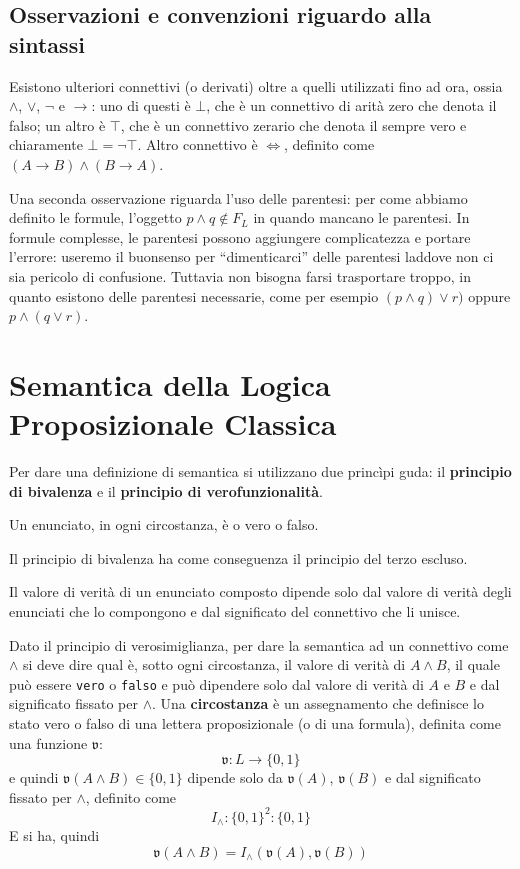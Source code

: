 \subsection{Osservazioni e convenzioni riguardo alla sintassi}
Esistono ulteriori connettivi (o derivati) oltre a quelli utilizzati fino ad ora, 
ossia $\land$, $\lor$, $\neg$ e $\rightarrow$: 
uno di questi è $\bot$, che è un connettivo di arità zero che denota il falso; un 
altro è $\top$, che è un connettivo zerario che denota il
sempre vero e chiaramente $\bot = \neg \top$. Altro connettivo è $\iff$, 
definito come $(A \rightarrow B) \land (B \rightarrow A)$.

Una seconda osservazione riguarda l'uso delle parentesi: per come abbiamo definito 
le formule, l'oggetto $p \land q \notin F_L$ in quando mancano le parentesi. 
In formule complesse, le parentesi possono aggiungere complicatezza e portare l'errore: 
useremo il buonsenso per ``dimenticarci'' delle parentesi laddove non ci sia 
pericolo di confusione. Tuttavia non bisogna farsi trasportare troppo, in quanto 
esistono delle parentesi necessarie, come per esempio $(p \land q ) \lor r)$ 
oppure $p \land (q \lor r)$. 

\section{Semantica della Logica Proposizionale Classica}
Per dare una definizione di semantica si utilizzano due princìpi guda: il 
\textbf{principio di bivalenza} e il \textbf{principio di verofunzionalità}. 
\begin{pri}[Bivalenza]
Un enunciato, in ogni circostanza, è o vero o falso.
\end{pri}
Il principio di bivalenza ha come conseguenza il principio del terzo escluso. 
\begin{pri}
Il valore di verità di un enunciato composto dipende solo dal valore di verità 
degli enunciati che lo compongono e dal significato del connettivo che li unisce. 
\end{pri}
Dato il principio di verosimiglianza, per dare la semantica ad un connettivo come $\land$
si deve dire qual è, sotto ogni circostanza, il valore di verità di $A \land B$, 
il quale può essere \texttt{vero} o \texttt{falso} e può dipendere solo dal valore 
di verità di $A$ e $B$ e dal significato fissato per $\land$. 
Una \textbf{circostanza} è un assegnamento che definisce lo stato vero 
o falso di una lettera proposizionale (o di una formula), definita come 
una funzione $\mathfrak{v}$:
$$
\mathfrak{v} : L \rightarrow \{0,1\}
$$
e quindi $\mathfrak{v}(A \land B) \in \{0,1\}$ dipende solo da $\mathfrak{v}(A)$, 
$\mathfrak{v}(B)$ e dal significato fissato per $\land$, definito come 
$$
I_{\land}: \{0,1\}^2 : \{0,1\}
$$
E si ha, quindi
$$
\mathfrak{v}(A \land B ) = I_{\land} (\mathfrak{v}(A), \mathfrak{v}(B))
$$

